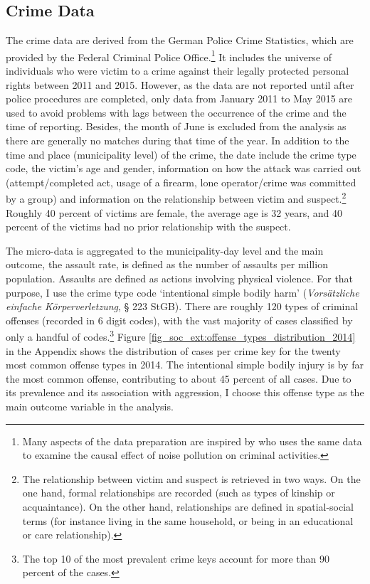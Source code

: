\subsection{Crime Data}
The crime data are derived from the German Police Crime Statistics, which are provided by the Federal Criminal Police Office.\footnote{Many aspects of the data preparation are inspired by \cite{hener2019noise} who uses the same data to examine the causal effect of noise pollution on criminal activities.} It includes the universe of individuals who were victim to a crime against their legally protected personal rights between 2011 and 2015. However, as the data are not reported until after police procedures are completed, only data from January 2011 to May 2015 are used to avoid problems with lags between the occurrence of the crime and the time of reporting. Besides, the month of June is excluded from the analysis as there are generally no matches during that time of the year. In addition to the time and place (municipality level) of the crime, the date include the crime type code, the victim's age and gender, information on how the attack was carried out (attempt/completed act, usage of a firearm, lone operator/crime was committed by a group) and information on the relationship between victim and suspect.\footnote{The relationship between victim and suspect is retrieved in two ways. On the one hand, formal relationships are recorded (such as types of kinship or acquaintance). On the other hand, relationships are defined in spatial-social terms (for instance living in the same household, or being in an educational or care relationship).} Roughly 40 percent of victims are female, the average age is 32 years, and 40 percent of the victims had no prior relationship with the suspect.




The micro-data is aggregated to the municipality-day level and the main outcome, the assault rate, is defined as the number of assaults per million population. Assaults are defined as actions involving physical violence. For that purpose, I use the crime type code `intentional simple bodily harm' (\textit{Vorsätzliche einfache Körperverletzung}, § 223 StGB). There are roughly 120 types of criminal offenses (recorded in 6 digit codes), with the vast majority of cases classified by only a handful of codes.\footnote{The top 10 of the most prevalent crime keys account for more than 90 percent of the cases.} Figure \ref{fig_soc_ext:offense_types_distribution_2014} in the Appendix shows the distribution of cases per crime key for the twenty most common offense types in 2014. The intentional simple bodily injury is by far the most common offense, contributing to about 45 percent of all cases. Due to its prevalence and its association with aggression, I choose this offense type as the main outcome variable in the analysis.

